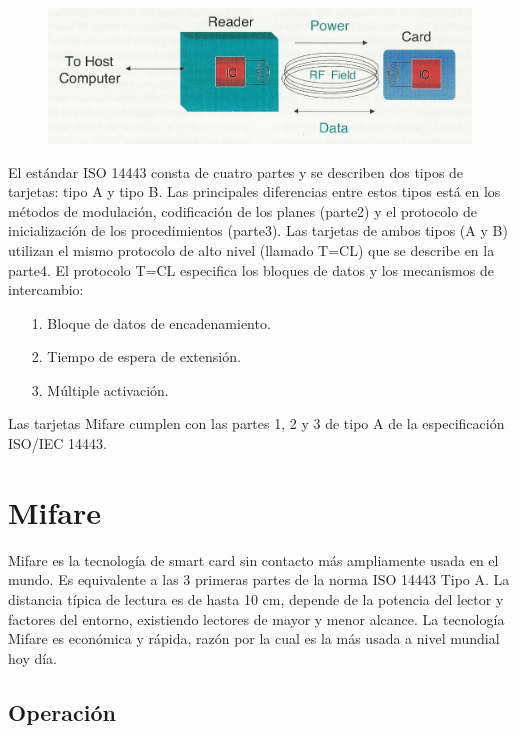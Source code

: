 \begin{figure}[H]
\centering
  \begin{center}
  \includegraphics[scale=.2]{Imagenes/sc2.jpg} 
  \end{center}
  \caption{}\label{Fig:RFID3} 
\end{figure}

El estándar ISO 14443 consta de cuatro partes y se describen dos tipos de tarjetas: tipo A y tipo B. Las principales diferencias entre estos tipos está en los métodos de modulación, codificación de los planes (parte2) y el protocolo de inicialización de los procedimientos (parte3). Las tarjetas de ambos tipos (A y B) utilizan el mismo protocolo de alto nivel (llamado T=CL) que se describe en la parte4. El protocolo T=CL especifica los bloques de datos y los mecanismos de intercambio:

\begin{itemize}
\item[1.] Bloque de datos de encadenamiento.
\item[2.] Tiempo de espera de extensión.
\item[3.] Múltiple activación.
\end{itemize}

Las tarjetas Mifare cumplen con las partes 1, 2 y 3 de tipo A de la especificación ISO/IEC 14443.


\section{Mifare}

Mifare es la tecnología de smart card sin contacto más ampliamente usada en el mundo. Es equivalente a las 3 primeras partes de la norma ISO 14443 Tipo A. La distancia típica de lectura es de hasta 10 cm, depende de la potencia del lector y factores del entorno, existiendo lectores de mayor y menor alcance.
La tecnología Mifare es económica y rápida, razón por la cual es la más usada a nivel mundial hoy día.


\subsection{Operación}

